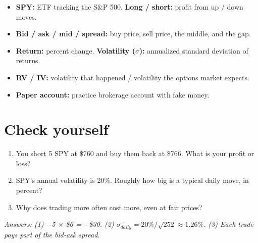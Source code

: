 \documentclass{article}
\begin{document}
\begin{itemize}

\item \textbf{SPY:} ETF tracking the S\&P 500. \textbf{Long /\allowbreak{} short:} profit from up /\allowbreak{} down moves.

\item \textbf{Bid /\allowbreak{} ask /\allowbreak{} mid /\allowbreak{} spread:} buy price, sell price, the middle, and the gap.

\item \textbf{Return:} percent change. \textbf{Volatility (\ensuremath{\sigma}):} annualized standard deviation of returns.

\item \textbf{RV /\allowbreak{} IV:} volatility that happened /\allowbreak{} volatility the options market expects.

\item \textbf{Paper account:} practice brokerage account with fake money.

\end{itemize}

\section{Check yourself}

\begin{enumerate}

\item You short 5 SPY at \$760 and buy them back at \$766. What is your profit or loss?

\item SPY's annual volatility is 20\%. Roughly how big is a typical daily move, in percent?

\item Why does trading more often cost more, even at fair prices?

\end{enumerate}

\emph{Answers: (1) \ensuremath{-}5 \ensuremath{\times} \$6 = \ensuremath{-}\$30. (2) $\sigma_{daily} = 20\% / \sqrt{252} \approx 1.26\%$. (3) Each trade pays part of the bid-ask spread.}
\end{document}

